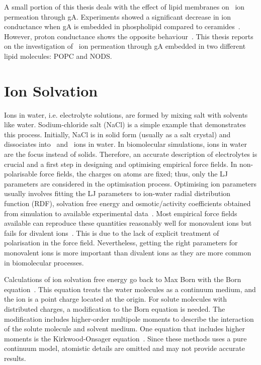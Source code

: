 A small portion of this thesis deals with the effect of lipid membranes on \K\ ion permeation 
through gA. Experiments showed a significant decrease in ion conductance when gA is embedded 
in phospholipid compared to ceramides~\cite{DeGodoy2011}. However, proton conductance shows 
the opposite behaviour~\cite{Wyatt2009}. This thesis reports on the investigation of \K\ ion 
permeation through gA embedded in two different lipid molecules: POPC and NODS. 

\section{Ion Solvation}

\vskip 0.5cm

Ions in water, i.e. electrolyte solutions, are formed by mixing salt with solvents like water. 
Sodium-chloride salt (NaCl) is a simple example that demonstrates this process. Initially, NaCl 
is in solid form (usually as a salt crystal) and dissociates into \Na\ and \Cl\ ions in water. 
In biomolecular simulations, ions in water are the focus instead of solids. Therefore, an accurate 
description of electrolytes is crucial and a first step in designing and optimising empirical 
force fields. In non-polarisable force fields, the charges on atoms are fixed; thus, only the LJ 
parameters are considered in the optimisation process. Optimising ion parameters usually involves 
fitting the LJ parameters to ion-water radial distribution function (RDF), solvation free energy 
and osmotic/activity coefficients obtained from simulation to available experimental 
data~\cite{Aqvist1990,Jensen2006,Luo2010a}. Most empirical force fields available can reproduce 
these quantities reasonably well for monovalent ions but fails for divalent ions~\cite{Timko2011}. 
This is due to the lack of explicit treatment of polarisation in the force field. Nevertheless, 
getting the right parameters for monovalent ions is more important than divalent ions as they are 
more common in biomolecular processes.

Calculations of ion solvation free energy go back to Max Born with the Born equation~\cite{Born1920}. 
This equation treats the water molecules as a continuum medium, and the ion is a point charge 
located at the origin. For solute molecules with distributed charges, a modification to the 
Born equation is needed. The modification includes higher-order multipole moments to describe 
the interaction of the solute molecule and solvent medium. One equation that includes higher 
moments is the Kirkwood-Onsager equation~\cite{Kirkwood1934}. Since these methods uses a pure 
continuum model, atomistic details are omitted and may not provide accurate results.

